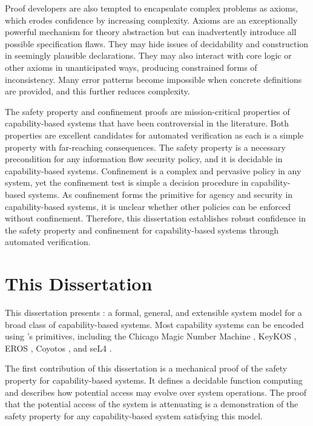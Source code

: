 Proof developers are also tempted to encapsulate complex problems as axioms, which erodes confidence by increasing complexity.
Axioms are an exceptionally powerful mechanism for theory abstraction but can inadvertently introduce all possible specification flaws.
They may hide issues of decidability and construction in seemingly plausible declarations.
They may also interact with core logic or other axioms in unanticipated ways, producing constrained forms of inconsistency.
Many error patterns become impossible when concrete definitions are provided, and this further reduces complexity.

The safety property and confinement proofs are mission-critical properties of capability-based systems that have been controversial in the literature.
Both properties are excellent candidates for automated verification as each is a simple property with far-reaching consequences.
The safety property is a necessary precondition for any information flow security policy, and it is decidable in capability-based systems.
Confinement is a complex and pervasive policy in any system, yet the confinement test is simple a decision procedure in capability-based systems.
As confinement forms the primitive for agency and security in capability-based systems, it is unclear whether other policies can be enforced without confinement.
Therefore, this dissertation establishes robust confidence in the safety property and confinement for capability-based systems through automated verification.

\section{This Dissertation}

This dissertation presents \TMmodelName{}: a formal, general, and extensible system model for a broad class of capability-based systems.
Most capability systems can be encoded using \TMmodelName{}'s primitives, including the Chicago Magic Number Machine \cite{Fabry:1974}, KeyKOS \cite{Hardy:KeyKOS}, EROS \cite{EROS} \cite{Shapiro97eros}, Coyotos \cite{Coyotos}, and seL4 \cite{Klein_AEMSKH_14}.

The first contribution of this dissertation is a mechanical proof of the safety property for capability-based systems.
It defines a decidable function computing  and describes how potential access may evolve over system operations.
The proof that the potential access of the system is attenuating is a demonstration of the safety property for any capability-based system satisfying this model.

